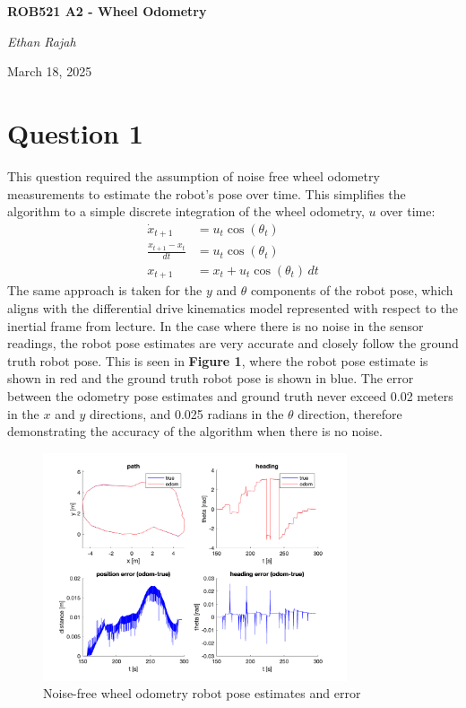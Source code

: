 \documentclass{article}
\begin{document}
\begin{titlepage}
\centering
	\vspace*{\fill}
	{\huge\bfseries ROB521 A2 - Wheel Odometry\par}
	\vspace{7cm}
	{\Large\itshape Ethan Rajah\par}
	{\Large March 18, 2025\par}
	\vspace*{\fill}
\end{titlepage}

\newpage
\section{Question 1}
This question required the assumption of noise free wheel odometry measurements to estimate the robot's pose over time.
This simplifies the algorithm to a simple discrete integration of the wheel odometry, $u$ over time:
\begin{align*}
    \dot{x}_{t+1} &= u_t \cos(\theta_t) \\
    \frac{x_{t+1} - x_t}{dt} &= u_t \cos(\theta_t) \\
    x_{t+1} &= x_t + u_t \cos(\theta_t) \, dt
\end{align*}
The same approach is taken for the $y$ and $\theta$ components of the robot pose, which aligns with the
differential drive kinematics model represented with respect to the inertial frame from lecture. In the case where there is no noise in the sensor readings,
the robot pose estimates are very accurate and closely follow the ground truth robot pose. This is seen in
\textbf{Figure 1}, where the robot pose estimate is shown in red and the ground truth robot pose is shown in blue.
The error between the odometry pose estimates and ground truth never exceed 0.02 meters in the $x$ and $y$ directions,
and 0.025 radians in the $\theta$ direction, therefore demonstrating the accuracy of the algorithm when there is no noise.

\begin{figure}[h!]
    \centering
    \includegraphics[width=0.8\textwidth]{ass1_q1.png}
    \caption{Noise-free wheel odometry robot pose estimates and error}
\end{figure}
\end{document}
